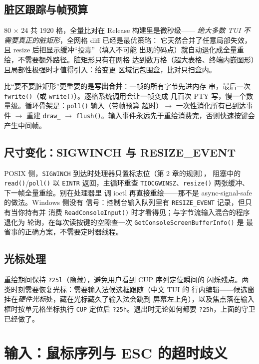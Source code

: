 \documentclass[12pt,a4paper,fontset=fandol]{ctexbook}
\newcommand{\Fn}[1]{\texttt{#1()}}
\newcommand{\Tp}[1]{\texttt{#1}}
\newcommand{\Bk}{\allowbreak}
\begin{document}
\subsection{脏区跟踪与帧预算}

80 $\times$ 24 共 1920 格，全量比对在 Release 构建里是微秒级——
\emph{绝大多数 TUI 不需要真正的脏矩形}，全网格 diff 已经是最优策略：
它天然合并了任意局部失效，且 resize 后把显示缓冲``投毒''（填入不可能
出现的码点）就自动退化成全量重绘，不需要额外路径。脏矩形只有在网格
达到数万格（超大表格、终端内嵌图形）且局部性极强时才值得引入：给变更
区域记包围盒，比对只扫盒内。

比``要不要脏矩形''更重要的是\textbf{写出合并}：一帧的所有字节先进内存
串，最后一次 \Fn{fwrite}（或 \Fn{write}）。逐格系统调用会让一帧变成
几百次 PTY 写，慢一个数量级。循环骨架是：\Fn{poll} 输入（带帧预算
超时）$\to$ 一次性消化所有已到达事件 $\to$ 重建 \Tp{draw\_} $\to$
\Fn{flush}。输入事件永远先于重绘消费完，否则快速按键会产生中间帧。

\subsection{尺寸变化：SIGWINCH 与 RESIZE\_EVENT}

POSIX 侧，\Tp{SIGWINCH} 到达时处理器只置标志位（第 2 章的规则），
阻塞中的 \Fn{read}/{\Bk}\Fn{poll} 以 \Tp{EINTR} 返回，主循环重查
\Tp{TIOCGWINSZ}、\Fn{resize} 两张缓冲、下一帧全量重绘。别在处理器里
调 ioctl 再直接重绘——那不是 async-signal-safe 的做法。Windows 侧没有
信号：控制台输入队列里有 \Tp{RESIZE\_EVENT} 记录，但只有当你持有并
消费 \Fn{ReadConsoleInput} 时才看得见；与字节流输入混合的程序退化为
轮询，在每次读按键的空隙查一次 \Fn{GetConsoleScreenBufferInfo} 是
最省事的正确方案，不需要定时器线程。

\subsection{光标处理}

重绘期间保持 \Tp{?25l}（隐藏），避免用户看到 CUP 序列定位瞬间的
闪烁残点。两类时刻需要恢复光标：需要输入法候选框跟随（中文 TUI 的
行内编辑——候选窗挂在\emph{硬件光标}处，藏在光标藏久了输入法会跳到
屏幕左上角），以及焦点落在输入框时按单元格坐标执行 \Tp{CUP} 定位后
\Tp{?25h}。退出时无论如何都要 \Tp{?25h}，上面的守卫已经做了。

\section{输入：鼠标序列与 ESC 的超时歧义}
\end{document}
